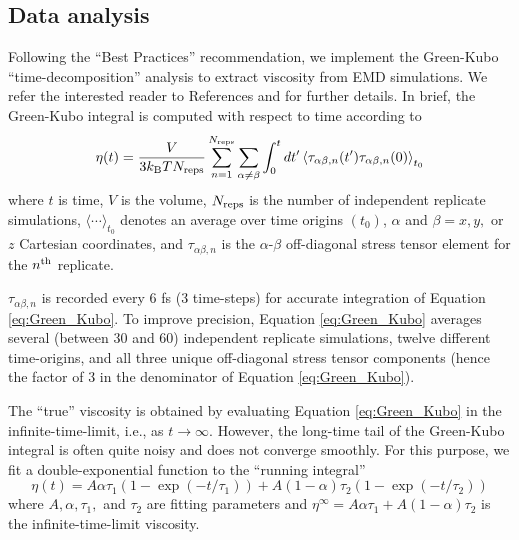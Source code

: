 \documentclass[preprint,review,12pt]{elsarticle}
\begin{document}
	\subsection{Data analysis}
	
	Following the ``Best Practices'' recommendation, we implement the Green-Kubo ``time-decomposition'' analysis to extract viscosity from EMD simulations. We refer the interested reader to References  and  for further details. In brief, the Green-Kubo integral is computed with respect to time according to
	\begin{equation} \label{eq:Green_Kubo}
	\eta(t) = \frac{V}{3 k_{\rm B} T N_{\rm reps}} \sum_{n=1}^{N_{\rm reps}} \sum_{\alpha \ne \beta} \int_{0}^{t}dt'\left\langle \tau_{\alpha\beta,n}(t') \tau_{\alpha\beta,n}(0)\right\rangle_{t_0}
	\end{equation} 
	where $t$ is time, $V$ is the volume, $N_{\rm reps}$ is the number of independent replicate simulations, $\langle \cdots \rangle_{t_0}$ denotes an average over time origins $(t_0)$, $\alpha$ and $\beta = x, y, $ or $z$ Cartesian coordinates, and $\tau_{\alpha\beta,n}$ is the $\alpha$-$\beta$ off-diagonal stress tensor element for the $n^{\rm th}$ replicate. 
	
	$\tau_{\alpha\beta,n}$ is recorded every 6 fs (3 time-steps) for accurate integration of Equation \ref{eq:Green_Kubo}. To improve precision, Equation \ref{eq:Green_Kubo} averages several (between 30 and 60) independent replicate simulations, twelve different time-origins, and all three unique off-diagonal stress tensor components (hence the factor of 3 in the denominator of Equation \ref{eq:Green_Kubo}).
	
	
	The ``true'' viscosity is obtained by evaluating Equation \ref{eq:Green_Kubo} in the infinite-time-limit, i.e., as $t \rightarrow \infty$. However, the long-time tail of the Green-Kubo integral is often quite noisy and does not converge smoothly. For this purpose, we fit a double-exponential function to the ``running integral''
	\begin{equation} \label{eq: Double exponential}
	\eta(t) = A \alpha \tau_1 \left(1-\exp{(-t/\tau_1)}\right) + A (1-\alpha) \tau_2 \left(1-\exp{(-t/\tau_2)}\right)
	\end{equation}
	where $A, \alpha, \tau_1, $ and $\tau_2$ are fitting parameters and $\eta^\infty = A \alpha \tau_1 + A (1-\alpha) \tau_2$ is the infinite-time-limit viscosity. 
	
\end{document}
